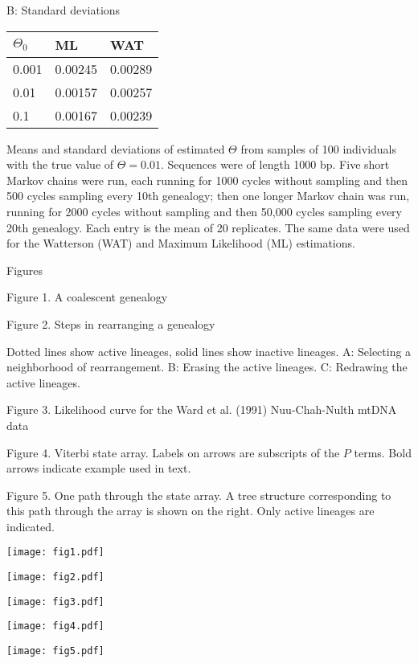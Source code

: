 \documentclass[12pt]{article}
\begin{document}
\begin{flushleft}
B:  Standard deviations
\bigskip

\begin{tabular}{l | l l }
$\Theta_0$ & ML & WAT  \\ 
\hline
0.001 & 0.00245 & 0.00289  \\
0.01  & 0.00157 & 0.00257 \\
0.1  & 0.00167 & 0.00239 \\
\end{tabular}

\bigskip
Means and standard deviations of estimated $\Theta$ from samples 
of 100 individuals with the true value of $\Theta=0.01$.  Sequences were
of length 1000 bp.
Five short Markov chains were run, each running for 1000 cycles without
sampling and then 500 cycles sampling every 10th genealogy; then one
longer Markov chain was run, running for 2000 cycles without sampling
and then 50,000 cycles sampling every 20th genealogy.
Each entry is the mean of 20 replicates.
The same data were used for the Watterson (WAT)
and Maximum Likelihood (ML) estimations.

\newpage
Figures
\bigskip
\end{flushleft}

Figure 1.  A coalescent genealogy

\bigskip

Figure 2.  Steps in rearranging a genealogy

Dotted lines show active
lineages, solid lines show inactive lineages.  A:  Selecting a
neighborhood of rearrangement.  B:  Erasing the active lineages.  C:
Redrawing the active lineages.

\bigskip

Figure 3.  Likelihood curve for the {\sc Ward} et al. (1991) 
Nuu-Chah-Nulth mtDNA data

\bigskip

Figure 4.  Viterbi state array.  Labels on arrows are subscripts of the
$P$ terms.  Bold arrows indicate example used in text.

\bigskip

Figure 5.  One path through the state array.  A tree structure 
corresponding to this path through the array is shown on the right. 
Only active lineages are indicated.

\newpage

\centerline{\texttt{[image: fig1.pdf]}}

\newpage

\centerline{\texttt{[image: fig2.pdf]}}

\newpage

\centerline{\texttt{[image: fig3.pdf]}}

\newpage

\centerline{\texttt{[image: fig4.pdf]}}

\newpage

\centerline{\texttt{[image: fig5.pdf]}}
\end{document}
